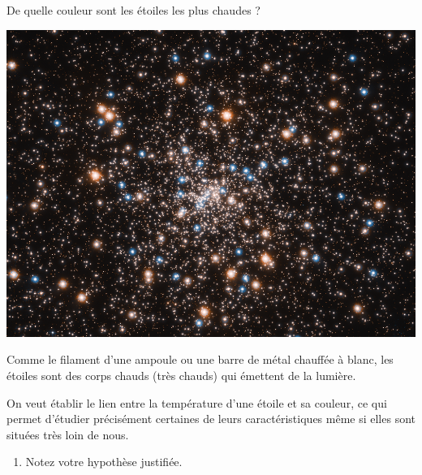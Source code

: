 \documentclass[12pt,a4paper,fleqn]{article}
\begin{document}
\begin{header}
\Large
De quelle couleur sont les étoiles les plus chaudes ?
\end{header}

\begin{multicols}{2}
\begin{center}
\includegraphics[trim=0 130 0 130, clip, width=\linewidth]{images/hubble_globular_cluster.png}
\end{center}

Comme le filament d'une ampoule ou une barre de métal chauffée à blanc, les étoiles sont des corps chauds (très chauds) qui émettent de la lumière.

On veut établir le lien entre la température d'une étoile et sa couleur, ce qui permet d'étudier précisément certaines de leurs caractéristiques même si elles sont situées très loin de nous.
\end{multicols}

\begin{enumerate}
\item \anarai{}
\label{quest:hyp}

Notez votre hypothèse justifiée.
\end{enumerate}

\begin{center}
\end{center}
\end{document}
